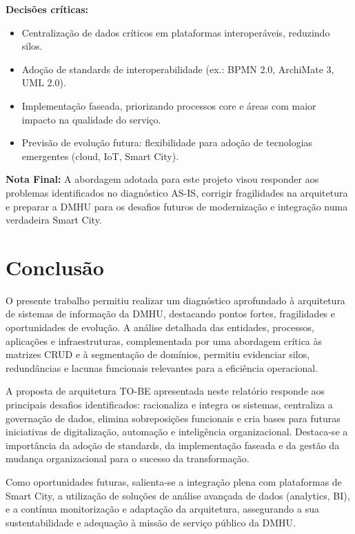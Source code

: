 \documentclass[12pt,a4paper,final]{article}
\begin{document}
    \textbf{Decisões críticas:}
    \begin{itemize}
        \item Centralização de dados críticos em plataformas interoperáveis, reduzindo silos.
        \item Adoção de standards de interoperabilidade (ex.: BPMN 2.0, ArchiMate 3, UML 2.0).
        \item Implementação faseada, priorizando processos core e áreas com maior impacto na qualidade do serviço.
        \item Previsão de evolução futura: flexibilidade para adoção de tecnologias emergentes (cloud, IoT, Smart City).
    \end{itemize}

    \textbf{Nota Final:} A abordagem adotada para este projeto visou responder aos problemas identificados no diagnóstico AS-IS, corrigir fragilidades na arquitetura e preparar a DMHU para os desafios futuros de modernização e integração numa verdadeira Smart City.

    \section*{Conclusão}

    O presente trabalho permitiu realizar um diagnóstico aprofundado à arquitetura de sistemas de informação da DMHU, destacando pontos fortes, fragilidades e oportunidades de evolução. A análise detalhada das entidades, processos, aplicações e infraestruturas, complementada por uma abordagem crítica às matrizes CRUD e à segmentação de domínios, permitiu evidenciar silos, redundâncias e lacunas funcionais relevantes para a eficiência operacional.

    A proposta de arquitetura TO-BE apresentada neste relatório responde aos principais desafios identificados: racionaliza e integra os sistemas, centraliza a governação de dados, elimina sobreposições funcionais e cria bases para futuras iniciativas de digitalização, automação e inteligência organizacional. Destaca-se a importância da adoção de standards, da implementação faseada e da gestão da mudança organizacional para o sucesso da transformação.

    Como oportunidades futuras, salienta-se a integração plena com plataformas de Smart City, a utilização de soluções de análise avançada de dados (analytics, BI), e a contínua monitorização e adaptação da arquitetura, assegurando a sua sustentabilidade e adequação à missão de serviço público da DMHU.



    \newpage
    \nocite{*}
    \printbibliography
\end{document}
